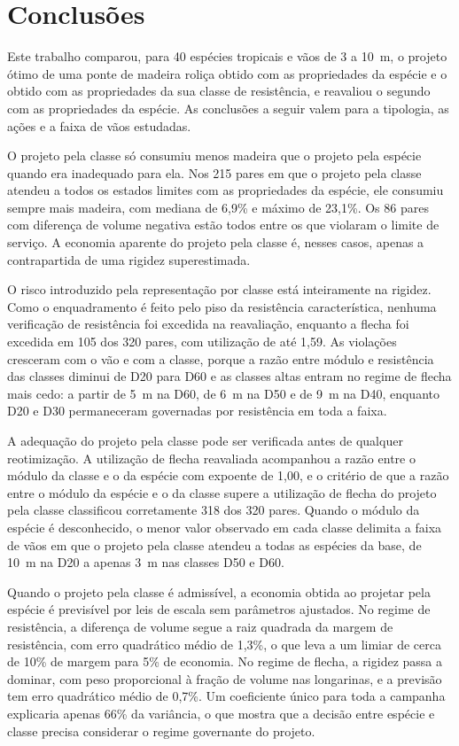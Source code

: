 \section{Conclusões}\label{sec:conclusions}

Este trabalho comparou, para 40 espécies tropicais e vãos de 3 a 10~m, o projeto ótimo de uma ponte de madeira roliça obtido com as propriedades da espécie e o obtido com as propriedades da sua classe de resistência, e reavaliou o segundo com as propriedades da espécie. As conclusões a seguir valem para a tipologia, as ações e a faixa de vãos estudadas.

O projeto pela classe só consumiu menos madeira que o projeto pela espécie quando era inadequado para ela. Nos 215 pares em que o projeto pela classe atendeu a todos os estados limites com as propriedades da espécie, ele consumiu sempre mais madeira, com mediana de 6,9\% e máximo de 23,1\%. Os 86 pares com diferença de volume negativa estão todos entre os que violaram o limite de serviço. A economia aparente do projeto pela classe é, nesses casos, apenas a contrapartida de uma rigidez superestimada.

O risco introduzido pela representação por classe está inteiramente na rigidez. Como o enquadramento é feito pelo piso da resistência característica, nenhuma verificação de resistência foi excedida na reavaliação, enquanto a flecha foi excedida em 105 dos 320 pares, com utilização de até 1,59. As violações cresceram com o vão e com a classe, porque a razão entre módulo e resistência das classes diminui de D20 para D60 e as classes altas entram no regime de flecha mais cedo: a partir de 5~m na D60, de 6~m na D50 e de 9~m na D40, enquanto D20 e D30 permaneceram governadas por resistência em toda a faixa.

A adequação do projeto pela classe pode ser verificada antes de qualquer reotimização. A utilização de flecha reavaliada acompanhou a razão entre o módulo da classe e o da espécie com expoente de 1,00, e o critério de que a razão entre o módulo da espécie e o da classe supere a utilização de flecha do projeto pela classe classificou corretamente 318 dos 320 pares. Quando o módulo da espécie é desconhecido, o menor valor observado em cada classe delimita a faixa de vãos em que o projeto pela classe atendeu a todas as espécies da base, de 10~m na D20 a apenas 3~m nas classes D50 e D60.

Quando o projeto pela classe é admissível, a economia obtida ao projetar pela espécie é previsível por leis de escala sem parâmetros ajustados. No regime de resistência, a diferença de volume segue a raiz quadrada da margem de resistência, com erro quadrático médio de 1,3\%, o que leva a um limiar de cerca de 10\% de margem para 5\% de economia. No regime de flecha, a rigidez passa a dominar, com peso proporcional à fração de volume nas longarinas, e a previsão tem erro quadrático médio de 0,7\%. Um coeficiente único para toda a campanha explicaria apenas 66\% da variância, o que mostra que a decisão entre espécie e classe precisa considerar o regime governante do projeto.

